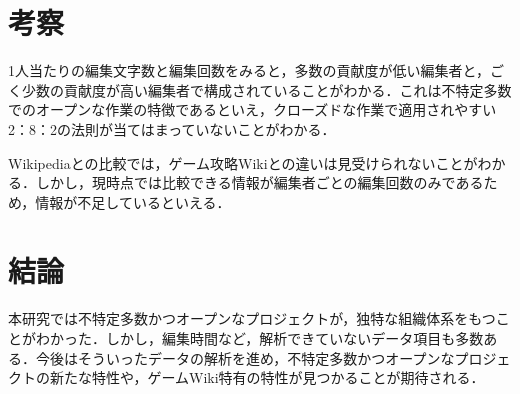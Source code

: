 \documentclass[uplatex,twocolumn,dvipdfmx]{jsarticle}
\begin{document}
\section{考察}

1人当たりの編集文字数と編集回数をみると，多数の貢献度が低い編集者と，ごく少数の貢献度が高い編集者で構成されていることがわかる．これは不特定多数でのオープンな作業の特徴であるといえ，クローズドな作業で適用されやすい2：8：2の法則が当てはまっていないことがわかる．

Wikipediaとの比較では，ゲーム攻略Wikiとの違いは見受けられないことがわかる．しかし，現時点では比較できる情報が編集者ごとの編集回数のみであるため，情報が不足しているといえる．

\section{結論}

本研究では不特定多数かつオープンなプロジェクトが，独特な組織体系をもつことがわかった．しかし，編集時間など，解析できていないデータ項目も多数ある．今後はそういったデータの解析を進め，不特定多数かつオープンなプロジェクトの新たな特性や，ゲームWiki特有の特性が見つかることが期待される．


\end{document}
